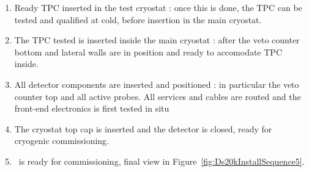 \begin{enumerate}
\item Ready TPC inserted in the test cryostat : once this is done, the TPC can be tested and qualified at cold, before insertion in the main cryostat.
  
\item The TPC tested is inserted inside the main cryostat : after the veto counter bottom and lateral walls are in position and ready to accomodate TPC inside.

\item All detector components are inserted and positioned : in particular the veto counter top and all active probes. All services and cables are routed and the front-end electronics is first tested in situ

\item The cryostat top cap is inserted and the detector is closed, ready for
cryogenic commissioning.

\item \DSks\ is ready for commissioning, final view in Figure~\ref{fig:Ds20kInstallSequence5}.
	
\end{enumerate}

\newpage 

